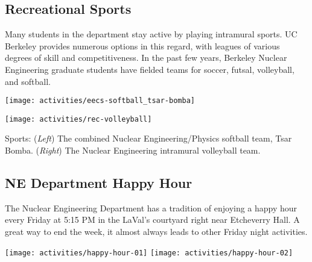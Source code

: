 \clearpage
\subsection*{Recreational Sports}
Many students in the department stay active by playing intramural sports. UC Berkeley provides numerous options in this regard, with leagues of various degrees of skill and competitiveness. In the past few years, Berkeley Nuclear Engineering graduate students have fielded teams for soccer, futsal, volleyball, and softball. 

\vspace{0.5cm}
\begin{minipage}{0.98\textwidth}
	\begin{minipage}{0.5\textwidth}
		\begin{center}
			\texttt{[image: activities/eecs-softball\_tsar-bomba]}
		\end{center}
	\end{minipage}
	\begin{minipage}{0.5\textwidth}
		\begin{center}
			\texttt{[image: activities/rec-volleyball]}
		\end{center}
	\end{minipage}
	\vspace{0.1cm}

	Sports: (\textit{Left}) The combined Nuclear Engineering/Physics softball team, Tsar Bomba. (\textit{Right}) The Nuclear Engineering intramural volleyball team.
\end{minipage}

\subsection*{NE Department Happy Hour}

The Nuclear Engineering Department has a tradition of enjoying a happy hour every Friday at 5:15 PM in the LaVal’s courtyard right near Etcheverry Hall. 
A great way to end the week, it almost always leads to other Friday night activities.

\vspace{0.25cm}
\begin{minipage}[t]{\textwidth}
	\begin{center}
		\texttt{[image: activities/happy-hour-01]}
		\hspace{0.5cm}
		\texttt{[image: activities/happy-hour-02]}
	\end{center}
\end{minipage}
